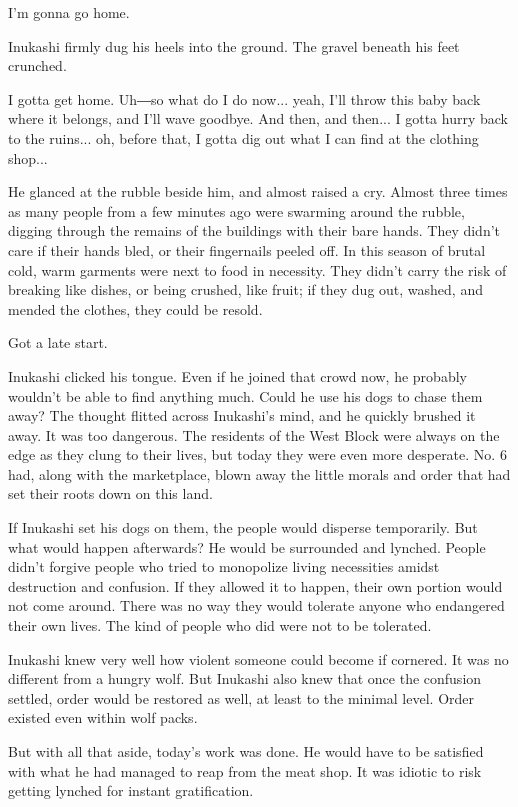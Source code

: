 I'm gonna go home.

Inukashi firmly dug his heels into the ground. The gravel beneath his
feet crunched.

I gotta get home. Uh―so what do I do now... yeah, I'll throw this baby
back where it belongs, and I'll wave goodbye. And then, and then... I
gotta hurry back to the ruins... oh, before that, I gotta dig out what I
can find at the clothing shop...

He glanced at the rubble beside him, and almost raised a cry. Almost
three times as many people from a few minutes ago were swarming around
the rubble, digging through the remains of the buildings with their bare
hands. They didn't care if their hands bled, or their fingernails peeled
off. In this season of brutal cold, warm garments were next to food in
necessity. They didn't carry the risk of breaking like dishes, or being
crushed, like fruit; if they dug out, washed, and mended the clothes,
they could be resold.

Got a late start.

Inukashi clicked his tongue. Even if he joined that crowd now, he
probably wouldn't be able to find anything much. Could he use his dogs
to chase them away? The thought flitted across Inukashi's mind, and he
quickly brushed it away. It was too dangerous. The residents of the West
Block were always on the edge as they clung to their lives, but today
they were even more desperate. No. 6 had, along with the marketplace,
blown away the little morals and order that had set their roots down on
this land.

If Inukashi set his dogs on them, the people would disperse temporarily.
But what would happen afterwards? He would be surrounded and lynched.
People didn't forgive people who tried to monopolize living necessities
amidst destruction and confusion. If they allowed it to happen, their
own portion would not come around. There was no way they would tolerate
anyone who endangered their own lives. The kind of people who did were
not to be tolerated.

Inukashi knew very well how violent someone could become if cornered. It
was no different from a hungry wolf. But Inukashi also knew that once
the confusion settled, order would be restored as well, at least to the
minimal level. Order existed even within wolf packs.

But with all that aside, today's work was done. He would have to be
satisfied with what he had managed to reap from the meat shop. It was
idiotic to risk getting lynched for instant gratification.

